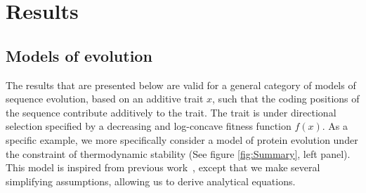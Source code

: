 \section{Results}

\subsection{Models of evolution}

The results that are presented below are valid for a general category of models of sequence evolution, based on an additive trait $x$, such that the coding positions of the sequence contribute additively to the trait.
The trait is under directional selection specified by a decreasing and log-concave fitness function $f(x)$. As a specific example, we more specifically consider a model of protein evolution under the constraint of thermodynamic stability (See figure \ref{fig:Summary}, left panel). This model is inspired from previous work~\citep{Williams2006, Goldstein2011, Pollock2012}, except that we make several simplifying assumptions, allowing us to derive analytical equations.

